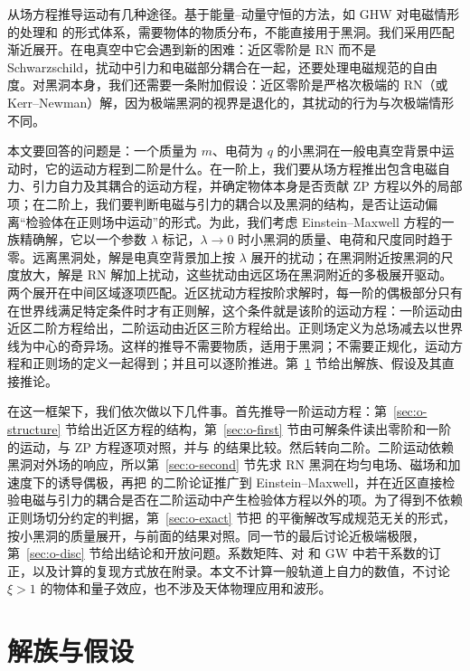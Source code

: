 \documentclass[11pt,a4paper]{ctexart}
\begin{document}
从场方程推导运动有几种途径。基于能量--动量守恒的方法，如 GHW 对电磁情形的处理和 \citet{HarteBlancoFlanagan2025} 的形式体系，需要物体的物质分布，不能直接用于黑洞。我们采用匹配渐近展开。在电真空中它会遇到新的困难：近区零阶是 RN 而不是 Schwarzschild，扰动中引力和电磁部分耦合在一起，还要处理电磁规范的自由度。对黑洞本身，我们还需要一条附加假设：近区零阶是严格次极端的 RN（或 Kerr--Newman）解，因为极端黑洞的视界是退化的，其扰动的行为与次极端情形不同。

本文要回答的问题是：一个质量为 $m$、电荷为 $q$ 的小黑洞在一般电真空背景中运动时，它的运动方程到二阶是什么。在一阶上，我们要从场方程推出包含电磁自力、引力自力及其耦合的运动方程，并确定物体本身是否贡献 ZP 方程以外的局部项；在二阶上，我们要判断电磁与引力的耦合以及黑洞的结构，是否让运动偏离“检验体在正则场中运动”的形式。为此，我们考虑 Einstein--Maxwell 方程的一族精确解，它以一个参数 $\lambda$ 标记，$\lambda\to0$ 时小黑洞的质量、电荷和尺度同时趋于零。远离黑洞处，解是电真空背景加上按 $\lambda$ 展开的扰动；在黑洞附近按黑洞的尺度放大，解是 RN 解加上扰动，这些扰动由远区场在黑洞附近的多极展开驱动。两个展开在中间区域逐项匹配。近区扰动方程按阶求解时，每一阶的偶极部分只有在世界线满足特定条件时才有正则解，这个条件就是该阶的运动方程：一阶运动由近区二阶方程给出，二阶运动由近区三阶方程给出。正则场定义为总场减去以世界线为中心的奇异场。这样的推导不需要物质，适用于黑洞；不需要正规化，运动方程和正则场的定义一起得到；并且可以逐阶推进。第~\ref{sec:o-assump} 节给出解族、假设及其直接推论。

在这一框架下，我们依次做以下几件事。首先推导一阶运动方程：第~\ref{sec:o-structure} 节给出近区方程的结构，第~\ref{sec:o-first} 节由可解条件读出零阶和一阶的运动，与 ZP 方程逐项对照，并与 \citet{FutamaseHoganItoh2008} 的结果比较。然后转向二阶。二阶运动依赖黑洞对外场的响应，所以第~\ref{sec:o-second} 节先求 RN 黑洞在均匀电场、磁场和加速度下的诱导偶极，再把 \citet{Gralla2012} 的二阶论证推广到 Einstein--Maxwell，并在近区直接检验电磁与引力的耦合是否在二阶运动中产生检验体方程以外的项。为了得到不依赖正则场切分约定的判据，第~\ref{sec:o-exact} 节把 \citet{AlekseevBelinski2007} 的平衡解改写成规范无关的形式，按小黑洞的质量展开，与前面的结果对照。同一节的最后讨论近极端极限，第~\ref{sec:o-disc} 节给出结论和开放问题。系数矩阵、对 \citet{Gralla2012} 和 GW 中若干系数的订正，以及计算的复现方式放在附录。本文不计算一般轨道上自力的数值，不讨论 $\xi>1$ 的物体和量子效应，也不涉及天体物理应用和波形。

\section{解族与假设}\label{sec:o-assump}
\end{document}

